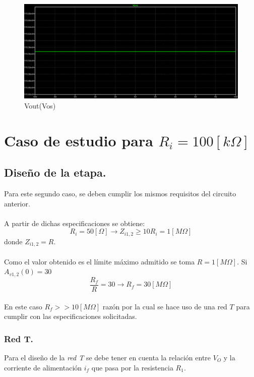 \documentclass[11pt, a4paper]{article}
\begin{document}
\begin{figure}[H]
    \centering
    \includegraphics[scale=0.4]{Imagenes/Vo_Vos=2mV_CC.png}
    \caption{Vout(Vos)}
    \label{fig:enter-label}
\end{figure}
\newpage

\section{Caso de estudio para $R_i=100[k\Omega]$}
\subsection{Diseño de la etapa.}
Para este segundo caso, se deben cumplir los mismos requisitos del circuito anterior.
\paragraph{}
A partir de dichas especificaciones se obtiene:
\begin{equation}
    \nonumber
    R_i=50[\Omega] \longrightarrow Z_{i1,2} \geq 10R_i = 1[M\Omega]
\end{equation}
donde $Z_{i1,2} = R$.
\paragraph{}
Como el valor obtenido es el límite máximo admitido se toma $R=1[M\Omega]$. Si $A_{v1,2}(0)=30$
\begin{equation}
    \nonumber
    \frac{R_f}{R}=30 \longrightarrow R_f=30[M\Omega]
\end{equation}
\paragraph{}
En este caso $R_f >> 10[M\Omega]$ razón por la cual se hace uso de una red $T$ para cumplir con las especificaciones solicitadas.

\subsubsection{Red T.}
\onehalfspacing
Para el diseño de la \textit{red T} se debe tener en cuenta la relación entre $V_O$ y la corriente de alimentación $i_f$ que pasa por la resistencia $R_1$.
\end{document}
